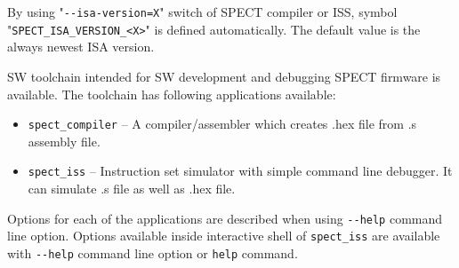 \documentclass[notconfidential]{tropic_design_spec}
\begin{document}
By using "\texttt{-{}-isa-version=X}" switch of SPECT compiler or ISS, symbol\linebreak
"\texttt{SPECT_ISA_VERSION_<X>}" is defined automatically. The default value is the always newest ISA version.


SW toolchain intended for SW development and debugging SPECT firmware is available. The toolchain
has following applications available:

\begin{itemize}
    \item \texttt{spect_compiler} -- A compiler/assembler which creates .hex file from .s
                            assembly file.
    \item \texttt{spect_iss} -- Instruction set simulator with simple command line debugger.
                       It can simulate .s file as well as .hex file.
\end{itemize}

Options for each of the applications are described when using \texttt{-{}-help}
command line option. Options available inside interactive shell of
\texttt{spect_iss} are available with \texttt{-{}-help} command line option or \texttt{help}
command.


\PrintOpenIssueSummary
\end{document}
